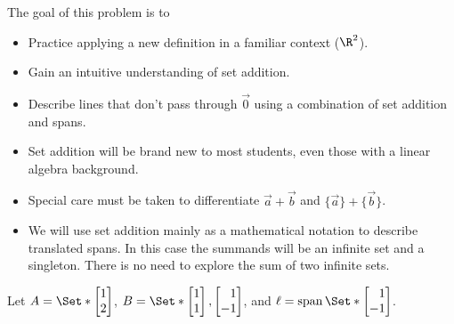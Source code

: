 	\question
	\begin{annotation}
		\begin{goals}

			The goal of this problem is to
			\begin{itemize}
				\item Practice applying a new definition in a familiar context ($\R^2$).
				\item Gain an intuitive understanding of set addition.
				\item Describe lines that don't pass through $\vec 0$ using
					a combination of set addition and spans.
			\end{itemize}
		\end{goals}

		\begin{notes}
			\begin{itemize}
				\item Set addition will be brand new to most students, even
					those with a linear algebra background.
				\item Special care must be taken to differentiate
					$\vec a+\vec b$ and $\{\vec a\}+\{\vec b\}$.
				\item We will use set addition mainly as a mathematical
					notation to describe translated spans. In this
					case the summands will be an infinite set
					and a singleton. There is no need to explore the sum
					of two infinite sets.
			\end{itemize}
		\end{notes}
	\end{annotation}
	Let $A=\Set*{\mat{1\\2}}$, $B=\Set*{\mat{1\\1},\mat{1\\-1}}$,
	and $\ell=\Span\Set*{\mat{1\\-1}}$.

